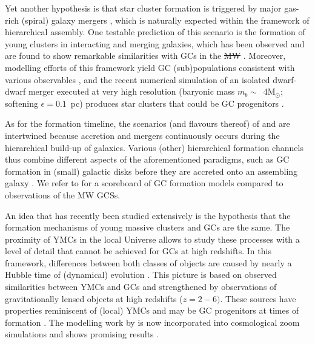 \documentclass[a4paper,fleqn,usenatbib]{mnras}
\newcommand{\Sun}[0]{\ensuremath{_{\odot}}}
\providecommand{\DIFadd}[1]{{\protect\color{blue}\uwave{#1}}} %
\providecommand{\DIFdel}[1]{{\protect\color{red}\sout{#1}}}                      %
\providecommand{\DIFaddbegin}{} %
\providecommand{\DIFaddend}{} %
\providecommand{\DIFdelbegin}{} %
\providecommand{\DIFdelend}{} %
\newcommand{\DIFscaledelfig}{0.5}
\newlength{\DIFdelgraphicswidth} %
\newlength{\DIFdelgraphicsheight} %
\newcommand{\DIFaddincludegraphics}[2][]{{\color{blue}\fbox{\DIFOincludegraphics[#1]{#2}}}} %
\newcommand{\DIFdelincludegraphics}[2][]{%
\sbox{\DIFdelgraphicsbox}{\DIFOincludegraphics[#1]{#2}}%
\settoboxwidth{\DIFdelgraphicswidth}{\DIFdelgraphicsbox} %
\settoboxtotalheight{\DIFdelgraphicsheight}{\DIFdelgraphicsbox} %
\scalebox{\DIFscaledelfig}{%
\parbox[b]{\DIFdelgraphicswidth}{\usebox{\DIFdelgraphicsbox}\\[-\baselineskip] \rule{\DIFdelgraphicswidth}{0em}}\llap{\resizebox{\DIFdelgraphicswidth}{\DIFdelgraphicsheight}{%
\setlength{\unitlength}{\DIFdelgraphicswidth}%
\begin{picture}(1,1)%
\thicklines\linethickness{2pt} %
{\color[rgb]{1,0,0}\put(0,0){\framebox(1,1){}}}%
{\color[rgb]{1,0,0}\put(0,0){\line( 1,1){1}}}%
{\color[rgb]{1,0,0}\put(0,1){\line(1,-1){1}}}%
\end{picture}%
}\hspace*{3pt}}} %
} %
\DeclareRobustCommand{\DIFaddbegin}{\DIFOaddbegin \let\includegraphics\DIFaddincludegraphics} %
\DeclareRobustCommand{\DIFaddend}{\DIFOaddend \let\includegraphics\DIFOincludegraphics} %
\DeclareRobustCommand{\DIFdelbegin}{\DIFOdelbegin \let\includegraphics\DIFdelincludegraphics} %
\DeclareRobustCommand{\DIFdelend}{\DIFOaddend \let\includegraphics\DIFOincludegraphics} %
\begin{document}
\DIFaddbegin \newpage  %
\DIFaddend Yet another hypothesis is that star cluster formation is triggered by major 
gas-rich (spiral) galaxy mergers \citep{1987nngp.proc...18S, 1992ApJ...384...50A},
which is naturally expected within the framework of hierarchical assembly. One
testable prediction of this scenario is the formation of young clusters in
interacting and merging galaxies, which has been observed and are found to show 
remarkable similarities with GCs in the \DIFdelbegin \DIFdel{MW }\DIFdelend \DIFaddbegin \DIFadd{Milky Way (MW) }\DIFaddend \citep[e.g.][]{
1995AJ....109..960W, 1996AJ....112..416H, 1999AJ....118..752Z, 1999AJ....118.1551W}.
Moreover, modelling efforts of this framework yield GC (sub)populations consistent 
with various observables \citep[e.g.][]{2010ApJ...718.1266M, 2018MNRAS.480.2343C}, 
and the recent numerical simulation of an isolated dwarf-dwarf merger executed at 
very high resolution (baryonic mass $m_b \sim$~4M\Sun; softening $\epsilon = 0.1$~pc) 
produces star clusters that could be GC progenitors \citep{
2019arXiv190509840L}.

As for the formation timeline, the scenarios (and flavours thereof) of \citet{
1985ApJ...298...18F} and \citet{1992ApJ...384...50A} are intertwined because
accretion and mergers continuously occurs during the hierarchical build-up of
galaxies. Various (other) hierarchical formation channels thus combine different
aspects of the aforementioned paradigms, such as GC formation in (small) galactic
disks before they are accreted onto an assembling galaxy \citep[e.g.][]{
2000ApJ...533..869C, 2002ApJ...567..853C, 2002MNRAS.333..383B, 2003egcs.conf..224G}. 
We refer to \citet{2001astro.ph..8034G} for a scoreboard of GC formation models 
compared to observations of the MW GCSs.

An idea that has recently been studied extensively is the hypothesis that the formation
mechanisms of young massive clusters \citep[YMCs, see][for a review]{2010ARA&A..48..431P} 
and GCs are the same. The proximity of YMCs in the local Universe allows to study these 
processes with a level of detail that cannot be achieved for GCs at high redshifts. In 
this framework, differences between both classes of objects are caused by nearly a 
Hubble time of (dynamical) evolution \citep[e.g.][]{1987degc.book.....S}. This picture 
is based on observed similarities between YMCs and GCs
\citep[e.g.][]{1992AJ....103..691H,1999AJ....118.1551W} and strengthened by observations
of gravitationally lensed objects at high redshifts ($z = 2-6)$. These sources have 
properties reminiscent of (local) YMCs and may be GC progenitors at times of formation 
\citep{2017MNRAS.467.4304V,2017ApJ...843L..21J}. The modelling work by 
\citet{2011MNRAS.414.1339K,2012MNRAS.421.1927K,2015MNRAS.454.1658K} is now 
incorporated into cosmological zoom simulations and shows promising results
\citep{2018MNRAS.475.4309P,2019MNRAS.486.3134K}.
\end{document}
